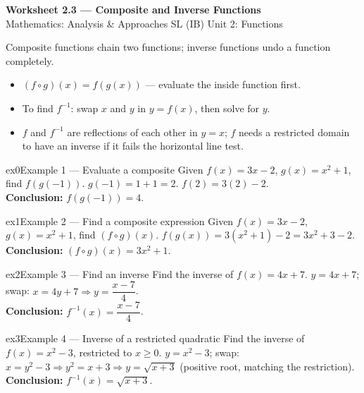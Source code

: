 \documentclass[11pt]{article}
\begin{document}
\begin{center}
{\LARGE\bfseries\color{titleblue}Worksheet 2.3 --- Composite and Inverse Functions}\\[2pt]
{\small Mathematics: Analysis \& Approaches SL (IB) \textperiodcentered{} Unit 2: Functions}
\end{center}

\begin{ideabox}
Composite functions chain two functions; inverse functions undo a function completely.
\begin{itemize}[leftmargin=*,itemsep=2pt]
  \item $(f\circ g)(x)=f(g(x))$ --- evaluate the inside function first.
  \item To find $f^{-1}$: swap $x$ and $y$ in $y=f(x)$, then solve for $y$.
  \item $f$ and $f^{-1}$ are reflections of each other in $y=x$; $f$ needs a restricted domain to have an inverse if it fails the horizontal line test.
\end{itemize}
\end{ideabox}


\begin{example}{ex0}{Example 1 --- Evaluate a composite}
Given $f(x)=3x-2$, $g(x)=x^2+1$, find $f(g(-1))$.\soln
$g(-1)=1+1=2$. $f(2)=3(2)-2$.\\[3pt]\textbf{Conclusion:} $f(g(-1))=4$.
\end{example}

\begin{example}{ex1}{Example 2 --- Find a composite expression}
Given $f(x)=3x-2$, $g(x)=x^2+1$, find $(f\circ g)(x)$.\soln
$f(g(x))=3(x^2+1)-2=3x^2+3-2$.\\[3pt]\textbf{Conclusion:} $(f\circ g)(x)=3x^2+1$.
\end{example}

\begin{example}{ex2}{Example 3 --- Find an inverse}
Find the inverse of $f(x)=4x+7$.\soln
$y=4x+7$; swap: $x=4y+7\Rightarrow y=\dfrac{x-7}{4}$.\\[3pt]\textbf{Conclusion:} $f^{-1}(x)=\dfrac{x-7}{4}$.
\end{example}

\begin{example}{ex3}{Example 4 --- Inverse of a restricted quadratic}
Find the inverse of $f(x)=x^2-3$, restricted to $x\geq0$.\soln
$y=x^2-3$; swap: $x=y^2-3\Rightarrow y^2=x+3\Rightarrow y=\sqrt{x+3}$ (positive root, matching the restriction).\\[3pt]\textbf{Conclusion:} $f^{-1}(x)=\sqrt{x+3}$.
\end{example}
\end{document}
